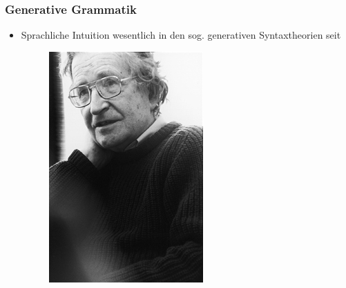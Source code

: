 %
%
%
%
%	
%


\begin{frame}
\frametitle{Generative Grammatik}

\begin{itemize}

	\item Sprachliche Intuition \ras wesentlich in den sog. generativen Syntaxtheorien seit \citet{Chomsky57x}

\begin{figure}
\centering
	\includegraphics[scale=.5]{material/chomsky01}\label{Abb1}
\end{figure}

	
\end{itemize}

\end{frame}


